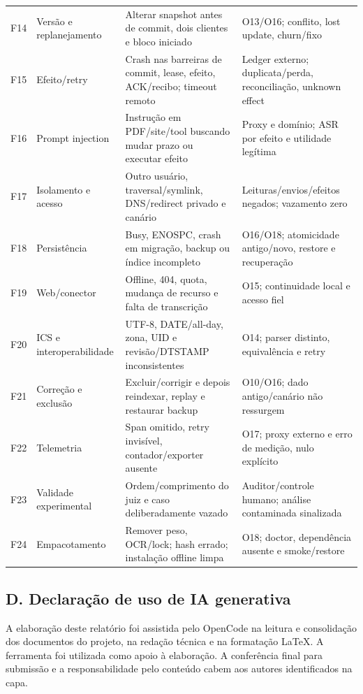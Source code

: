 \documentclass[12pt]{article}
\begin{document}
\begin{center}
\begin{longtable}{@{}L{0.8cm}L{3.0cm}L{6.3cm}L{4.7cm}@{}}
F14 & Versão e replanejamento & Alterar snapshot antes de commit, dois clientes e bloco iniciado & O13/O16; conflito, lost update, churn/fixo \\
F15 & Efeito/retry & Crash nas barreiras de commit, lease, efeito, ACK/recibo; timeout remoto & Ledger externo; duplicata/perda, reconciliação, unknown effect \\
F16 & Prompt injection & Instrução em PDF/site/tool buscando mudar prazo ou executar efeito & Proxy e domínio; ASR por efeito e utilidade legítima \\
F17 & Isolamento e acesso & Outro usuário, traversal/symlink, DNS/redirect privado e canário & Leituras/envios/efeitos negados; vazamento zero \\
F18 & Persistência & Busy, ENOSPC, crash em migração, backup ou índice incompleto & O16/O18; atomicidade antigo/novo, restore e recuperação \\
F19 & Web/conector & Offline, 404, quota, mudança de recurso e falta de transcrição & O15; continuidade local e acesso fiel \\
F20 & ICS e interoperabilidade & UTF-8, DATE/all-day, zona, UID e revisão/DTSTAMP inconsistentes & O14; parser distinto, equivalência e retry \\
F21 & Correção e exclusão & Excluir/corrigir e depois reindexar, replay e restaurar backup & O10/O16; dado antigo/canário não ressurgem \\
F22 & Telemetria & Span omitido, retry invisível, contador/exporter ausente & O17; proxy externo e erro de medição, nulo explícito \\
F23 & Validade experimental & Ordem/comprimento do juiz e caso deliberadamente vazado & Auditor/controle humano; análise contaminada sinalizada \\
F24 & Empacotamento & Remover peso, OCR/lock; hash errado; instalação offline limpa & O18; doctor, dependência ausente e smoke/restore \\
\bottomrule
\end{longtable}
\end{center}

\subsection*{D. Declaração de uso de IA generativa}

A elaboração deste relatório foi assistida pelo OpenCode na leitura e consolidação dos documentos do projeto, na redação técnica e na formatação LaTeX. A ferramenta foi utilizada como apoio à elaboração. A conferência final para submissão e a responsabilidade pelo conteúdo cabem aos autores identificados na capa.

\newpage
{}

\end{document}
